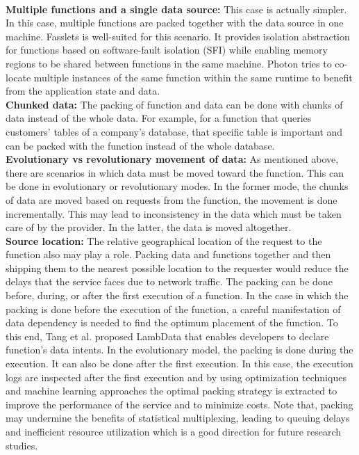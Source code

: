 \\
\noindent \textbf{Multiple functions and a single data source:} This case is actually simpler. In this case, multiple functions are packed together with the data source in one machine. Fasslets  is well-suited for this scenario. It provides isolation abstraction for functions based on software-fault isolation (SFI) while enabling memory regions to be shared between functions in the same machine. Photon  tries to co-locate multiple instances of the same function within the same runtime to benefit from the application state and data. 
\\
\noindent \textbf{Chunked data:} The packing of function and data can be done with chunks of data instead of the whole data. For example, for a function that queries customers' tables of a company's database, that specific table is important and can be packed with the function instead of the whole database.
\\
\noindent \textbf{Evolutionary vs revolutionary movement of data:}
As mentioned above, there are scenarios in which data must be moved toward the function. This can be done in evolutionary or revolutionary modes. In the former mode, the chunks of data are moved based on requests from the function, the movement is done incrementally. This may lead to inconsistency in the data which must be taken care of by the provider. In the latter, the data is moved altogether.
\\
\noindent \textbf{Source location:} The relative geographical location of the request to the function also may play a role. Packing data and functions together and then shipping them to the nearest possible location to the requester would reduce the delays that the service faces due to network traffic. 
The packing can be done before, during, or after the first execution of a function. In the case in which the packing is done before the execution of the function, a careful manifestation of data dependency is needed to find the optimum placement of the function. To this end, Tang et al.  proposed LambData that enables developers to declare function’s data intents. In the evolutionary model, the packing is done during the execution. It can also be done after the first execution. In this case, the execution logs are inspected after the first execution and by using optimization techniques and machine learning approaches the optimal packing strategy is extracted to improve the performance of the service and to minimize costs. Note that, packing may undermine the benefits of statistical multiplexing, leading to queuing delays and inefficient resource utilization which is a good direction for future research studies.

